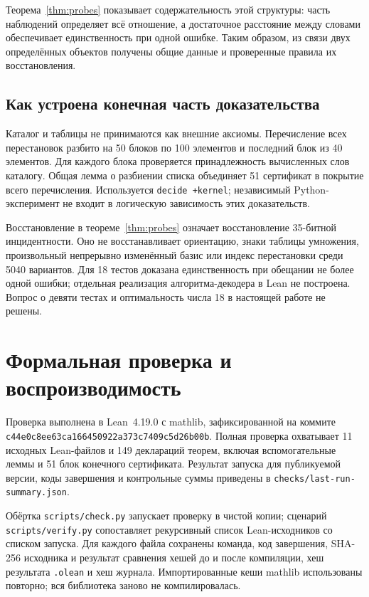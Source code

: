\documentclass[11pt,a4paper]{article}
\numberwithin{equation}{section}
\theoremstyle{definition}
\theoremstyle{remark}
\begin{document}
Теорема~\ref{thm:probes} показывает содержательность этой структуры:
часть наблюдений определяет всё отношение, а достаточное расстояние
между словами обеспечивает единственность при одной ошибке.
Таким образом, из связи двух определённых объектов получены
общие данные и проверенные правила их восстановления.

\subsection{Как устроена конечная часть доказательства}
Каталог и таблицы не принимаются как внешние аксиомы.
Перечисление всех перестановок разбито на 50 блоков по 100 элементов
и последний блок из 40 элементов. Для каждого блока проверяется
принадлежность вычисленных слов каталогу. Общая лемма о разбиении
списка объединяет 51 сертификат в покрытие всего перечисления.
Используется \texttt{decide +kernel}; независимый Python-эксперимент
не входит в логическую зависимость этих доказательств.

Восстановление в теореме~\ref{thm:probes} означает восстановление
35-битной инцидентности. Оно не восстанавливает ориентацию,
знаки таблицы умножения, произвольный непрерывно изменённый базис
или индекс перестановки среди 5040 вариантов. Для 18 тестов
доказана единственность при обещании не более одной ошибки;
отдельная реализация алгоритма-декодера в Lean не построена.
Вопрос о девяти тестах и оптимальность числа 18 в настоящей работе
не решены.

\section{Формальная проверка и воспроизводимость}\label{sec:verification}
Проверка выполнена в Lean~4.19.0 с mathlib, зафиксированной на коммите
\nolinkurl{c44e0c8ee63ca166450922a373c7409c5d26b00b}.
Полная проверка охватывает 11 исходных Lean-файлов и
149 деклараций теорем, включая вспомогательные леммы
и 51 блок конечного сертификата. Результат запуска для
публикуемой версии, коды завершения и контрольные суммы
приведены в \nolinkurl{checks/last-run-summary.json}.

Обёртка \nolinkurl{scripts/check.py} запускает проверку в чистой копии;
сценарий \nolinkurl{scripts/verify.py} сопоставляет рекурсивный список
Lean-исходников со списком запуска. Для каждого файла
сохранены команда, код завершения, SHA-256 исходника и результат
сравнения хешей до и после компиляции, хеш результата \texttt{.olean}
и хеш журнала.
Импортированные кеши mathlib использованы повторно; вся библиотека
заново не компилировалась.
\end{document}
